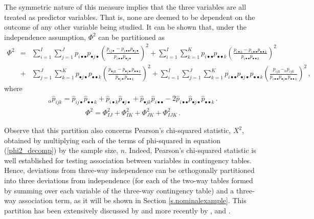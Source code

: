 The symmetric nature of this measure implies that the three variables are all treated as predictor variables. That is, none are deemed to be dependent on the outcome of any other variable being studied. It can be shown that, under the independence assumption,  $\Phi^2$ can be partitioned as 
\begin{eqnarray}
\label{AnovaChi}
\Phi^2  &=& \sum_{i=1}^I\sum_{j=1}^J p_{i \bullet \bullet }p_{\bullet j\bullet }  \left (\frac{p_{ij\bullet }-p_{i\bullet \bullet }p_{\bullet j\bullet }}{p_{i \bullet \bullet }p_{\bullet j\bullet }} \right )^2
 + \sum_{i=1}^I\sum_{k=1}^K p_{i \bullet \bullet }p_{\bullet \bullet k} \left (\frac{p_{i\bullet k}-p_{i \bullet \bullet }p_{\bullet \bullet k}}{p_{i \bullet \bullet }p_{\bullet \bullet k}} \right )^2 \\
& + & \sum_{j=1}^J\sum_{k=1}^Kp_{\bullet j\bullet}p_{\bullet \bullet k}\left (\frac{p_{\bullet jk}-p_{\bullet j\bullet}p_{\bullet \bullet k}}{p_{\bullet j\bullet}p_{\bullet \bullet k}} \right )^2
 + \sum_{i=1}^I\sum_{j=1}^J\sum_{k=1}^K p_{i \bullet \bullet }p_{\bullet j\bullet }p_{\bullet
\bullet k} \left (\frac{p_{ijk}-_{\alpha}p_{ijk}}{p_{i \bullet \bullet }p_{\bullet j\bullet }p_{\bullet
\bullet k}} \right )^2 \,,  \nonumber
\end{eqnarray}
{
\noindent where 
\begin{eqnarray}
{_{\alpha}\hat{p}_{ijk}}=\hat{p}_{ij\bullet}\hat{p}_{\bullet \bullet k}+\hat{p}_{i\bullet k}\hat{p}_{\bullet j \bullet }+ \hat{p}_{\bullet j k}\hat{p}_{i\bullet  \bullet}-2\hat{p}_{i\bullet  \bullet}\hat{p}_{\bullet j \bullet}\hat{p}_{\bullet  \bullet k}\, .
\end{eqnarray}
}
\begin{eqnarray}
\label{phi2_decomp}
\Phi^2 = \Phi_{IJ}^2 + \Phi_{IK}^2 + \Phi_{JK}^2 + \Phi_{IJK}^2 \,.
\end{eqnarray}

\noindent Observe that this partition also concerns Pearson’s chi-squared statistic, $X^2$, \cite[]{lan51,lomtakbeh20} obtained by multiplying each
of the terms of phi-squared  in equation (\ref{phi2_decomp}) by the sample size, $n$. Indeed, Pearson’s chi-squared statistic is well established for testing association between variables in contingency tables. Hence, deviations from three-way independence can be  orthogonally partitioned into three deviations from independence (for each of the two-way tables formed by summing over each variable of the three-way contingency table) and a three-way association term, as it  will be shown in Section \ref{s.nominalexample}.
This partition has been extensively discussed by \citet{carkro96} and more recently by \citet[Chap. 17]{kro08}, \citet{loi16} and \citet{lomtakbeh20}. \\


